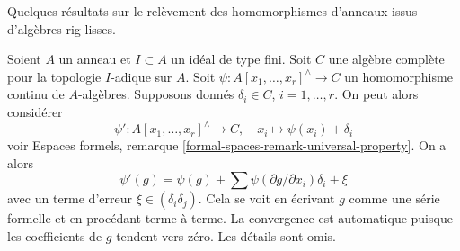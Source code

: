\noindent
Quelques résultats sur le relèvement des homomorphismes d'anneaux issus
d'algèbres rig-lisses.

\begin{remark}
\label{remark-linear-approximation}
Soient $A$ un anneau et $I \subset A$ un idéal de type fini. Soit $C$ une
algèbre complète pour la topologie $I$-adique sur $A$. Soit
$\psi : A[x_1, \ldots, x_r]^\wedge \to C$ un homomorphisme continu de
$A$-algèbres. Supposons donnés $\delta_i \in C$, $i = 1, \ldots, r$. On peut
alors considérer
$$
\psi' : A[x_1, \ldots, x_r]^\wedge \to C,\quad
x_i \longmapsto \psi(x_i) + \delta_i
$$
voir Espaces formels, remarque
\ref{formal-spaces-remark-universal-property}. On a alors
$$
\psi'(g) = \psi(g) + \sum \psi(\partial g/\partial x_i)\delta_i + \xi
$$
avec un terme d'erreur $\xi \in (\delta_i\delta_j)$. Cela se voit en écrivant
$g$ comme une série formelle et en procédant terme à terme. La convergence est
automatique puisque les coefficients de $g$ tendent vers zéro. Les détails
sont omis.
\end{remark}

